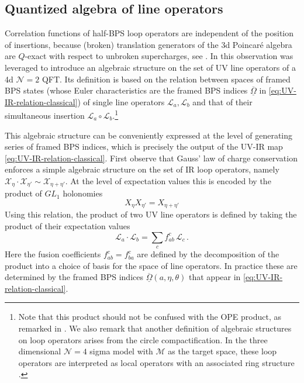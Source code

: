 \documentclass{article}
\numberwithin{equation}{section}
\def\be{\begin{equation}}
\def\ee{\end{equation}}
\def\CL{\mathcal{L}}
\def\CM{{\mathcal{M}}}
\def\CN{{\mathcal{N}}}
\def\scL{\mathscr{L}}
\def\scX{\mathscr{X}}
\def\fOmega{\overline{\underline{\Omega}}}
\begin{document}
\subsection{Quantized algebra of line operators}\label{sec:deformation-quantization}

Correlation functions of half-BPS loop operators are independent of the position of insertions, because (broken) translation generators of the 3d Poincar\'e algebra are $Q$-exact with respect to unbroken supercharges, see \cite{Kapustin:2006hi, Kapustin:2007wm}.
In \cite{Gaiotto:2010be} this observation was leveraged to introduce an algebraic structure on the set of UV line operators
of a 4d $\CN=2$ QFT.
Its definition is based on the relation between spaces of framed BPS states (whose Euler characteristics are the framed BPS indices $\fOmega$ in \eqref{eq:UV-IR-relation-classical}) of single line operators $\scL_a, \scL_b$ and that of their simultaneous insertion $\scL_a\circ \scL_b$.\footnote{
Note that this product should not be confused with the OPE product, as remarked in \cite[Section 3.6]{Gaiotto:2010be}. We also remark that another definition of algebraic structures on loop operators arises from the circle compactification. 
In the three dimensional $\mathcal{N}=4$ sigma model with $\CM$ as the target space, these loop operators are interpreted as local operators with an associated ring structure \cite{Cremonesi:2013lqa,Nakajima:2015txa, Braverman:2016wma}.
}

This algebraic structure can be conveniently expressed at the level of generating series of framed BPS indices, 
which is precisely the output of the UV-IR map \eqref{eq:UV-IR-relation-classical}.
First observe that Gauss' law of charge conservation enforces a simple algebraic structure on the set of IR loop operators, namely $\scX_\eta\cdot \scX_{\eta'}\sim \scX_{\eta+\eta'}$. 
At the level of expectation values this is encoded by the product of $GL_1$ holonomies
\be\label{eq:classical-IR-algebra}
	X_{\eta} X_{\eta'} =  X_{\eta+\eta'}
\ee
Using this relation, the product of two UV line operators is defined by taking the product of their expectation values
\be\label{eq:classical-UV-algebra}
	\CL_{a}\cdot \CL_{b} = \sum_{c} f_{ab}^c \, \CL_{c}\,.
\ee
Here the fusion coefficients $f_{ab}^c = f_{ba}^c$ are defined by the decomposition of the product into a choice of basis for the space of line operators.
In practice these are determined by the framed BPS indices $\fOmega(a,\eta,\theta)$ that appear in \eqref{eq:UV-IR-relation-classical}. 
\end{document}
